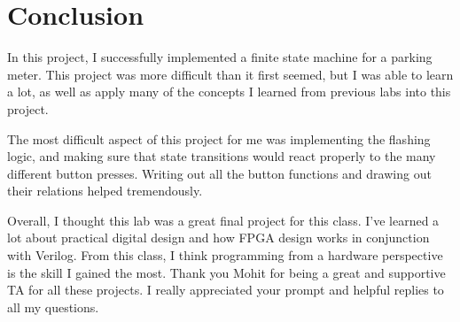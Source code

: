 \documentclass{article}
\begin{document}
\section{Conclusion}
In this project, I successfully implemented a finite state machine for a parking meter. This project was more difficult than it first seemed, but I was able to learn a lot, as well as apply many of the concepts I learned from previous labs into this project.

The most difficult aspect of this project for me was implementing the flashing logic, and making sure that state transitions would react properly to the many different button presses. Writing out all the button functions and drawing out their relations helped tremendously.

Overall, I thought this lab was a great final project for this class. I've learned a lot about practical digital design and how FPGA design works in conjunction with Verilog. From this class, I think programming from a hardware perspective is the skill I gained the most. Thank you Mohit for being a great and supportive TA for all these projects. I really appreciated your prompt and helpful replies to all my questions.
\end{document}
